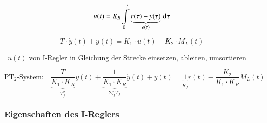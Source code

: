 \begin{minipage}[t]{0.48\columnwidth}
    \begin{center}
    \end{center}
    $$ u(t) = K_R \int\limits_0^t \underbrace{ r(\tau) - y(\tau)}_{e(\tau)} \, \mathop{} \! \mathrm{d} \tau $$
\end{minipage}
\hfill
\begin{minipage}[t]{0.48\columnwidth}
    \begin{center}
    \end{center}
    $$ T \cdot \dot{y}(t) + y(t) = K_1 \cdot u(t) - K_2 \cdot M_L(t) $$
\end{minipage}

\textrightarrow\ $u(t)$ von I-Regler in Gleichung der Strecke einsetzen, ableiten, umsortieren

$$ \boxed{ \text{PT}_2 \text{-System:} \quad \underbrace{ \frac{T}{K_1 \cdot K_R} }_{T_f^2} \ddot{y}(t) + \underbrace{ \frac{1}{K_1 \cdot K_R} }_{2 \zeta_f T_f} \dot{y}(t) + y(t) 
    = \underbrace{1}_{K_f} r(t) - \frac{K_2}{K_1 \cdot K_R} \dot{M}_L(t) } $$


\subsubsection{Eigenschaften des I-Reglers}

